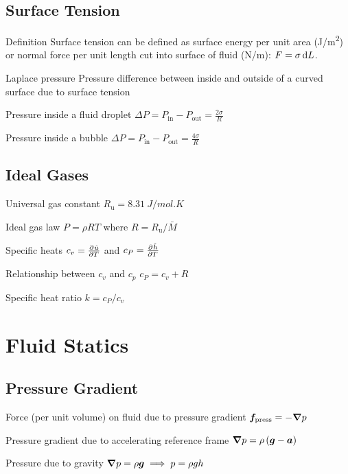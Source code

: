 \documentclass{article}
\begin{document}
\subsection{Surface Tension}
\begin{description*}
\item[Definition] Surface tension can be defined as surface energy per unit area (\si{J/m^2}) or
  normal force per unit length cut into surface of fluid (\si{N/m}): \(F = \sigma \dif L\).
\item[Laplace pressure] Pressure difference between inside and outside of a curved surface due to
  surface tension
  \begin{description*}
  \item[Pressure inside a fluid droplet]
    \(\Delta P = P_\mathrm{in} -
    P_\mathrm{out} = \frac{2\sigma}{R}\)
  \item[Pressure inside a bubble] \(\Delta P = P_\mathrm{in} -
    P_\mathrm{out} = \frac{4\sigma}{R}\)
  \end{description*}
\end{description*}

\subsection{Ideal Gases}
\begin{description*}
\item[Universal gas constant]
  \(R_\mathrm{u} = \SI{8.31}{J/mol.K}\)
\item[Ideal gas law]
  \(P = \rho R T\) where \(R = R_\mathrm{u}/\bar{M}\)
\item[Specific heats]
  \(c_v = \pd{\hat u}{T}\) and \(c_P = \pd{\hat h}{T}\)
\item[Relationship between $c_v$ and $c_p$]
  \(c_P = c_v + R\)
\item[Specific heat ratio]
  \(k = c_P/c_v\)
\end{description*}

\section{Fluid Statics}

\subsection{Pressure Gradient}
\begin{description*}
\item[Force (per unit volume) on fluid due to pressure gradient]
  \(\bm{f}_\mathrm{press} = -\bm{\nabla} p\)
\item[Pressure gradient due to accelerating reference frame]
  \(\bm{\nabla} p = \rho \left(\bm{g}-\bm{a}\right)\)
\item[Pressure due to gravity]
  \(\bm{\nabla} p = \rho \bm{g} \implies p = \rho g h\)
\end{description*}
\end{document}
